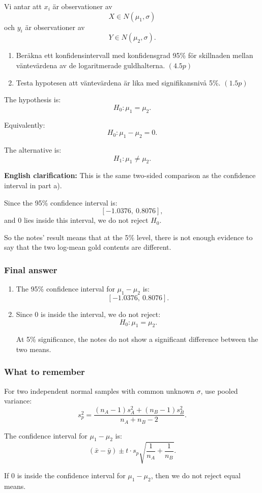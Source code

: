 \documentclass[10pt]{article}
\begin{document}
Vi antar att \(x_i\) är observationer av
\[
X\in N(\mu_1,\sigma)
\]
och \(y_i\) är observationer av
\[
Y\in N(\mu_2,\sigma).
\]

\begin{enumerate}[label=\alph*)]
\item Beräkna ett konfidensintervall med
konfidensgrad 95\% för skillnaden mellan
väntevärdena av de logaritmerade guldhalterna.
\((4.5p)\)

\item Testa hypotesen att väntevärdena är lika med
signifikansnivå 5\%. \((1.5p)\)
\end{enumerate}

The hypothesis is:
\[
H_0:\mu_1=\mu_2.
\]

Equivalently:
\[
H_0:\mu_1-\mu_2=0.
\]

The alternative is:
\[
H_1:\mu_1\ne \mu_2.
\]

\textbf{English clarification:}
This is the same two-sided comparison as the
confidence interval in part a).

Since the 95\% confidence interval is:
\[
[-1.0376,\ 0.8076],
\]
and \(0\) lies inside this interval, we do not reject
\(H_0\).

So the notes' result means that at the 5\% level,
there is not enough evidence to say that the two
log-mean gold contents are different.

\subsubsection*{Final answer}

\begin{enumerate}[label=\alph*)]
\item
The 95\% confidence interval for
\(\mu_1-\mu_2\) is:
\[
[-1.0376,\ 0.8076].
\]

\item
Since \(0\) is inside the interval, we do not reject:
\[
H_0:\mu_1=\mu_2.
\]

At 5\% significance, the notes do not show a
significant difference between the two means.
\end{enumerate}

\subsubsection*{What to remember}

For two independent normal samples with common
unknown \(\sigma\), use pooled variance:
\[
s_p^2
=
\frac{
(n_A-1)s_A^2+(n_B-1)s_B^2
}{
n_A+n_B-2
}.
\]

The confidence interval for \(\mu_1-\mu_2\) is:
\[
(\bar{x}-\bar{y})
\pm
t\cdot s_p
\sqrt{
\frac{1}{n_A}
+
\frac{1}{n_B}
}.
\]

If \(0\) is inside the confidence interval for
\(\mu_1-\mu_2\), then we do not reject equal means.
\end{document}
